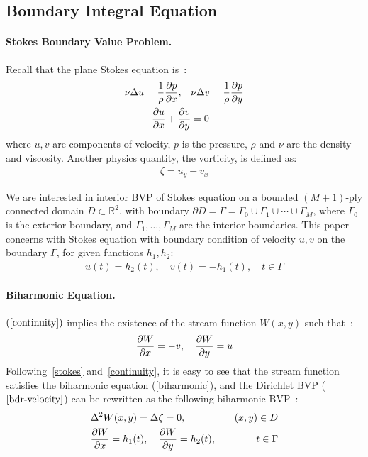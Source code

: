 \documentclass[10pt,twocolumn,letterpaper]{article}
\begin{document}
\subsection{Boundary Integral Equation}

\paragraph{Stokes Boundary Value Problem.}
Recall that the plane Stokes equation is~\cite{ladyzhenskayaMathematicalTheoryViscous1964}:
\begin{align}
  \nu \Delta u = \frac 1 \rho \pdv{p}{x},\quad & \nu \Delta v = \frac 1\rho \pdv{p}{y}
  \label{stokes}                                                                       \\
  \pdv{u}{x} + \pdv{v}{y}                      & = 0
  \label{continuity}
\end{align}
where $u,v$ are components of velocity, $p$ is the pressure,
$\rho$ and $\nu$ are the density and viscosity.
Another physics quantity, the vorticity, is defined as:
\begin{align}
\zeta  = u_y - v_x
\end{align}

We are interested in interior BVP of Stokes equation
on a bounded $(M+1)$-ply connected domain $D\subset \mathbb R^2$, 
with boundary $\partial D = \Gamma = \Gamma_0 \cup \Gamma_1 \cup \cdots \cup \Gamma_M$, 
where $\Gamma_0$ is the exterior boundary, 
and $\Gamma_1,\ldots, \Gamma_M$ are the interior boundaries. 
This paper concerns with Stokes equation with boundary condition of velocity $u,v$ on the boundary $\Gamma$,
for given functions $h_1,h_2$:
\begin{align}
  u(t) = h_2(t),\quad v(t) = - h_1(t), \quad t\in \Gamma
  \label{bdr-velocity}
\end{align}

\paragraph{Biharmonic Equation.} 
$(\ref{continuity})$ implies the existence of the stream function $W(x,y)$ 
such that~\cite{greengardIntegralEquationMethods1996}:
\begin{align}
  \pdv{W}{x} = -v,\quad \pdv{W}{y} = u \label{stream-1}
\end{align}
Following~\eqref{stokes} and~\eqref{continuity}, 
it is easy to see that the stream function 
satisfies the biharmonic equation (\ref{biharmonic}), 
and the Dirichlet BVP ($\ref{bdr-velocity}$) can be rewritten 
as the following biharmonic BVP~\cite{greengardIntegralEquationMethods1996}:
\begin{align}
   & \Delta^2 W(x,y) = \Delta \zeta = 0,                        & (x,y)\in D \label{biharmonic} \\
   & \pdv{W}{x}(t) = h_1(t),\quad \pdv{W}{y}(t) = h_2(t), \quad & t\in \Gamma\label{bih-bv}
\end{align}
\end{document}
